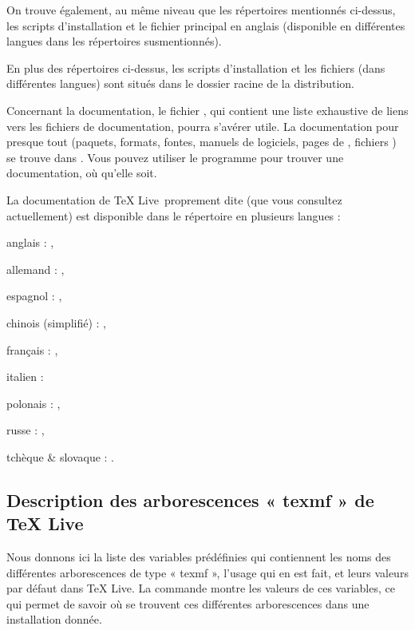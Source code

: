 \documentclass[german, english, french]{article}
\renewcommand{\TL}{\TeX{} Live\xspace}%
\begin{document}
On trouve également, au même niveau que les répertoires mentionnés ci-dessus,
les scripts d'installation et le fichier  principal en anglais
(disponible en différentes langues dans les répertoires 
susmentionnés).

En plus des répertoires ci-dessus, les scripts d'installation et les fichiers
 (dans différentes langues) sont situés dans le dossier racine
de la distribution.

Concernant la documentation, le fichier , qui contient une liste
exhaustive de liens vers les fichiers de documentation, pourra s'avérer utile.
La documentation pour presque tout (paquets, formats, fontes, manuels de
logiciels, pages de , fichiers ) se trouve dans
.  Vous pouvez utiliser le programme 
pour trouver une documentation, où qu'elle soit.

La documentation de \TL\ proprement dite (que vous consultez actuellement) est
disponible dans le répertoire  en plusieurs
langues :

\begin{itemize*}
\item{anglais :} ,
\item{allemand :} ,
\item{espagnol :} ,
\item{chinois (simplifié) :} ,
\item{français :} ,
\item{italien :} 
\item{polonais :} ,
\item{russe :} ,
\item{tchèque \& slovaque :} .
\end{itemize*}

\subsection{Description des arborescences « texmf » de \protect\TL}
\label{sec:texmftrees}

Nous donnons ici la liste des variables prédéfinies qui contiennent les noms des
différentes arborescences de type « texmf », l'usage qui en est fait, et leurs
valeurs par défaut dans \TL. La commande  montre les valeurs
de ces variables, ce qui permet de savoir où se trouvent ces différentes
arborescences dans une installation donnée.
\end{document}
